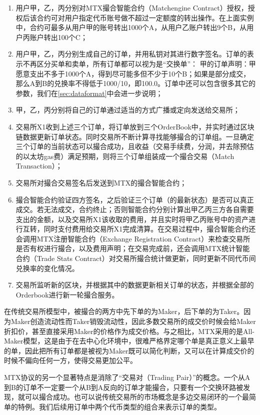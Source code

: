 \documentclass[UTF8,nofonts]{ctexart}
\begin{document}
\begin{enumerate}
	\item 用户甲，乙，丙分别对MTX撮合智能合约（Matchengine Contract）授权，授权后该合约可对用户指定代币账号做不超过一定额度的转出操作。在上面实例中，合约可最多从用户甲的账号转出1000个A，从用户乙账户转出9个B，从用户丙账户转出100个C；
	\item 用户甲，乙，丙分别生成自己的订单，并用私钥对其进行数字签名。订单的表示不再区分买单和卖单，所有订单都可以视为是“交换单”： 甲的订单声明：甲愿意支出不多于1000个A，得到尽可能多但不少于10个B；如果是部分成交，那么A到B的兑换率不得低于1000/10，即100.0。订单中还可以包含很多其它的参数，我们在\ref{sec:dataformat}中会进一步说明；
	\item 甲，乙，丙分别将自己的订单通过适当的方式广播或定向发送给交易所；
	\item 交易所X1收到上述三个订单，将订单放到三个OrderBook中，并实时通过区块链数据更新订单状态。同时交易所不断计算寻找能够撮合的订单组。一旦确定三个订单的当前状态可以撮合成功，且收益（交易手续费，分润，并去除预估的以太坊gas费）满足预期，则将三个订单组装成一个撮合交易（Match Transaction）；
	\item 交易所对撮合交易签名后发送到MTX的撮合智能合约；
	\item 撮合智能合约验证四方签名，之后验证三个订单（的最新状态）是否可以真正成交。若无法成交，合约终止；否则智能合约分别计算出甲乙丙三方各自需要支出的金额，以及交易所X1该收取的费用，并且实时将甲乙丙账号中的资产进行互转，同时支付费用给交易所X1完成清算。在交易过程中，撮合智能合约还会调用MTX注册智能合约（Exchange Registration Contract）来检查交易所是否有权进行撮合，以及费用声明；在交易完成前，还会调用MTX统计智能合约（Trade Stats Contract）对交易所撮合统计做更新，同时更新不同代币间兑换率的变化情况。
	\item 交易所监听新的区块，并根据其中的数据更新相关订单的状态，并根据全部的Orderbook进行新一轮撮合服务。
\end{enumerate}

在传统交易所模型中，被撮合的两方中先下单的为Maker，后下单的为Taker。因为Maker创造流动性而Taker销毁流动性，因此多数交易所的成交价时候会给Maker折扣价，甚至直接采用Maker的价格作为成交价格。与之相比，MTX采用的是All-Maker模型，这是由于在去中心化环境中，很难严格界定哪个单是真正意义上最早的单，因此把所有订单都是被视为Maker既可以简化判断，又可以在计算成交价的时候不偏向任何一方，使得交易更加公平。

MTX协议的另一个显著特点是消除了“交易对（Trading Pair）”的概念。一个从A到B的订单不一定要一个从B到A反向的订单才能撮合，只要有一个交换环路被发现，就可以撮合成功。也可以说传统交易所的市场概念是多边交易闭环的一个最简单的特例。我们后续用订单中两个代币类型的组合来表示订单的类型。
\end{document}

